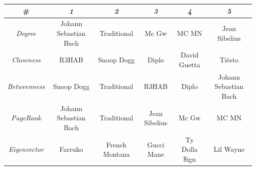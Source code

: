 \begin{table}[]
  \centering
  \begin{tabular}{|c|c|c|c|c|c|}
      \hline
      \textbf{\#}           & \textit{\textbf{1}}                                        & \textit{\textbf{2}}                                         & \textit{\textbf{3}}                                           & \textit{\textbf{4}}                                         & \textit{\textbf{5}}                                    \\ \hline
      \textit{Degree}       & Johann Sebastian Bach                                      & Traditional                                                 & Mc Gw                                                         & MC MN                                                       & Jean Sibelius                                          \\ \hline
      \textit{Closeness}    & R3HAB                                                      & Snoop Dogg                                                  & Diplo                                                         & David Guetta                                                & Tiësto                                                 \\ \hline
      \textit{Betweenness}  & Snoop Dogg                                                 & Traditional                                                 & R3HAB                                                         & Diplo                                                       & Johann Sebastian Bach                                  \\ \hline
      \textit{PageRank}     & Johann Sebastian Bach                                      & Traditional                                                 & Jean Sibelius                                                 & Mc Gw                                                       & MC MN                                                  \\ \hline
      \textit{Eigenvector}  & Farruko                                                    & French Montana                                              & Gucci Mane                                                    & Ty Dolla \$ign                                              & Lil Wayne                                              \\ \hline

\end{tabular}
\end{table}
